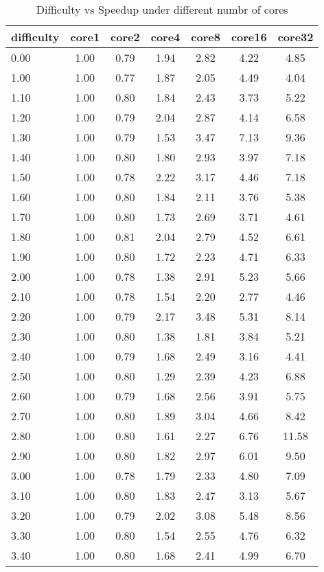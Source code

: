 \begin{table}
\caption{Difficulty vs Speedup under different numbr of cores}
\label{tab:speedup_comparison}
\begin{tabular}{lcccccc}
\toprule
difficulty & core1 & core2 & core4 & core8 & core16 & core32 \\
\midrule
0.00 & 1.00 & 0.79 & 1.94 & 2.82 & 4.22 & 4.85 \\
1.00 & 1.00 & 0.77 & 1.87 & 2.05 & 4.49 & 4.04 \\
1.10 & 1.00 & 0.80 & 1.84 & 2.43 & 3.73 & 5.22 \\
1.20 & 1.00 & 0.79 & 2.04 & 2.87 & 4.14 & 6.58 \\
1.30 & 1.00 & 0.79 & 1.53 & 3.47 & 7.13 & 9.36 \\
1.40 & 1.00 & 0.80 & 1.80 & 2.93 & 3.97 & 7.18 \\
1.50 & 1.00 & 0.78 & 2.22 & 3.17 & 4.46 & 7.18 \\
1.60 & 1.00 & 0.80 & 1.84 & 2.11 & 3.76 & 5.38 \\
1.70 & 1.00 & 0.80 & 1.73 & 2.69 & 3.71 & 4.61 \\
1.80 & 1.00 & 0.81 & 2.04 & 2.79 & 4.52 & 6.61 \\
1.90 & 1.00 & 0.80 & 1.72 & 2.23 & 4.71 & 6.33 \\
2.00 & 1.00 & 0.78 & 1.38 & 2.91 & 5.23 & 5.66 \\
2.10 & 1.00 & 0.78 & 1.54 & 2.20 & 2.77 & 4.46 \\
2.20 & 1.00 & 0.79 & 2.17 & 3.48 & 5.31 & 8.14 \\
2.30 & 1.00 & 0.80 & 1.38 & 1.81 & 3.84 & 5.21 \\
2.40 & 1.00 & 0.79 & 1.68 & 2.49 & 3.16 & 4.41 \\
2.50 & 1.00 & 0.80 & 1.29 & 2.39 & 4.23 & 6.88 \\
2.60 & 1.00 & 0.79 & 1.68 & 2.56 & 3.91 & 5.75 \\
2.70 & 1.00 & 0.80 & 1.89 & 3.04 & 4.66 & 8.42 \\
2.80 & 1.00 & 0.80 & 1.61 & 2.27 & 6.76 & 11.58 \\
2.90 & 1.00 & 0.80 & 1.82 & 2.97 & 6.01 & 9.50 \\
3.00 & 1.00 & 0.78 & 1.79 & 2.33 & 4.80 & 7.09 \\
3.10 & 1.00 & 0.80 & 1.83 & 2.47 & 3.13 & 5.67 \\
3.20 & 1.00 & 0.79 & 2.02 & 3.08 & 5.48 & 8.56 \\
3.30 & 1.00 & 0.80 & 1.54 & 2.55 & 4.76 & 6.32 \\
3.40 & 1.00 & 0.80 & 1.68 & 2.41 & 4.99 & 6.70 \\

\end{tabular}
\end{table}

